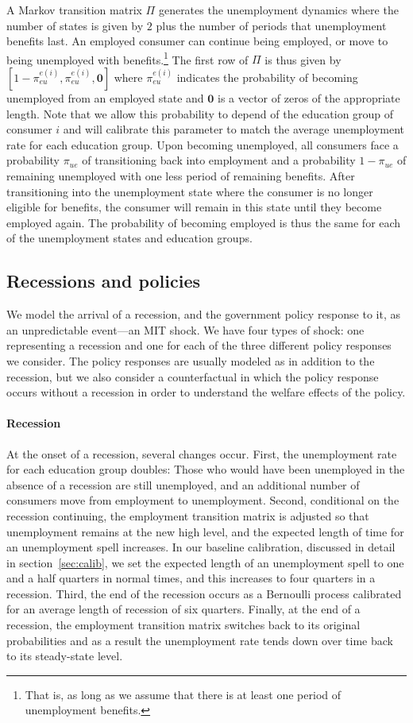 \documentclass[../HAFiscal]{subfiles}
\begin{document}
	A Markov transition matrix $\Pi$ generates the unemployment dynamics where the number of states is given by $2$ plus the number of periods that unemployment benefits last. An employed consumer can continue being employed, or move to being unemployed with benefits.\footnote{That is, as long as we assume that there is at least one period of unemployment benefits.} The first row of $\Pi$ is thus given by $[1-\pi_{eu}^{e(i)}, \pi_{eu}^{e(i)}, \mathbf{0}]$ where $\pi_{eu}^{e(i)}$ indicates the probability of becoming unemployed from an employed state and $\mathbf{0}$ is a vector of zeros of the appropriate length. Note that we allow this probability to depend of the education group of consumer $i$ and will calibrate this parameter to match the average unemployment rate for each education group. Upon becoming unemployed, all consumers face a probability $\pi_{ue}$ of transitioning back into employment and a probability $1-\pi_{ue}$ of remaining unemployed with one less period of remaining benefits. After transitioning into the unemployment state where the consumer is no longer eligible for benefits, the consumer will remain in this state until they become employed again. The probability of becoming employed is thus the same for each of the unemployment states and education groups. 	

	\subsection{Recessions and policies}
	\label{sec:recessions}
	We model the arrival of a recession, and the government policy response to it, as an unpredictable event---an MIT shock. We have four types of shock: one representing a recession and one for each of the three different policy responses we consider. The policy responses are usually modeled as in addition to the recession, but we also consider a counterfactual in which the policy response occurs without a recession in order to understand the welfare effects of the policy.
	
	\paragraph{Recession} At the onset of a recession, several changes occur. First, the unemployment rate for each education group doubles: Those who would have been unemployed in the absence of a recession are still unemployed, and an additional number of consumers move from employment to unemployment. Second, conditional on the recession continuing, the employment transition matrix is adjusted so that unemployment remains at the new high level, and the expected length of time for an unemployment spell increases. In our baseline calibration, discussed in detail in section~\ref{sec:calib}, we set the expected length of an unemployment spell to one and a half quarters in normal times, and this increases to four quarters in a recession. Third, the end of the recession occurs as a Bernoulli process calibrated for an average length of recession of six quarters. Finally, at the end of a recession, the employment transition matrix switches back to its original probabilities and as a result the unemployment rate tends down over time back to its steady-state level.
	
\end{document}
